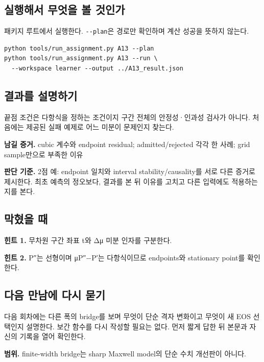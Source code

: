 \documentclass[
  10pt,
  a4paper,
]{article}
\begin{document}
\newpage

\subsection{실행해서 무엇을 볼
것인가}\label{uxc2e4uxd589uxd574uxc11c-uxbb34uxc5c7uxc744-uxbcfc-uxac83uxc778uxac00}

패키지 루트에서 실행한다. \texttt{-\/-plan}은 경로만 확인하며 계산
성공을 뜻하지 않는다.

\begin{verbatim}
python tools/run_assignment.py A13 --plan
python tools/run_assignment.py A13 --run \
  --workspace learner --output ../A13_result.json
\end{verbatim}

\subsection{결과를
설명하기}\label{uxacb0uxacfcuxb97c-uxc124uxba85uxd558uxae30}

끝점 조건은 다항식을 정하는 조건이지 구간 전체의 안정성·인과성 검사가
아니다. 처음에는 제공된 실패 예제로 어느 미분이 문제인지 찾는다.

\textbf{남길 증거.} cubic 계수와 endpoint residual; admitted/rejected
각각 한 사례; grid sample만으로 부족한 이유

\textbf{판단 기준.} 2점 예: endpoint 일치와 interval
stability/causality를 서로 다른 증거로 제시한다. 최초 예측의 정오보다,
결과를 본 뒤 이유를 고치고 다른 입력에도 적용하는지를 본다.

\subsection{막혔을 때}\label{uxb9c9uxd614uxc744-uxb54c}

\textbf{힌트 1.} 무차원 구간 좌표 t와 Δμ 미분 인자를 구분한다.

\textbf{힌트 2.} P″는 선형이며 μP″−P′는 다항식이므로 endpoints와
stationary point를 확인한다.

\subsection{다음 만남에 다시
묻기}\label{uxb2e4uxc74c-uxb9ccuxb0a8uxc5d0-uxb2e4uxc2dc-uxbb3buxae30}

다음 회차에는 다른 폭의 bridge를 보며 무엇이 단순 격자 변화이고 무엇이
새 EOS 선택인지 설명한다. 보간 함수를 다시 작성할 필요는 없다. 먼저 짧게
답한 뒤 본문과 자신의 기록을 열어 확인한다.

\textbf{범위.} finite-width bridge는 sharp Maxwell model의 단순 수치
개선판이 아니다.
\end{document}

